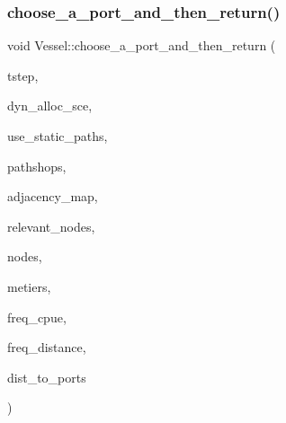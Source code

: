 \mbox{\label{class_vessel_a88fd9bd55e3ca8312d00adea41db2894}} 
\subsubsection{\texorpdfstring{choose\_a\_port\_and\_then\_return()}{choose\_a\_port\_and\_then\_return()}}
{\footnotesize\ttfamily void Vessel\+::choose\+\_\+a\+\_\+port\+\_\+and\+\_\+then\+\_\+return (\begin{DoxyParamCaption}\item[{int}]{tstep,  }\item[{const \mbox{\hyperlink{class_dyn_alloc_options}{Dyn\+Alloc\+Options}} \&}]{dyn\+\_\+alloc\+\_\+sce,  }\item[{int}]{use\+\_\+static\+\_\+paths,  }\item[{const std\+::vector$<$ \mbox{\hyperlink{class_path_shop}{Path\+Shop}} $>$ \&}]{pathshops,  }\item[{\mbox{\hyperlink{myutils_8h_ae689dbcb43e66abf9a513718b83bd87d}{adjacency\+\_\+map\+\_\+t}} \&}]{adjacency\+\_\+map,  }\item[{vector$<$ \mbox{\hyperlink{classtypes_1_1_node_id}{types\+::\+Node\+Id}} $>$ \&}]{relevant\+\_\+nodes,  }\item[{std\+::vector$<$ \mbox{\hyperlink{class_node}{Node}} $\ast$ $>$ \&}]{nodes,  }\item[{std\+::vector$<$ \mbox{\hyperlink{class_metier}{Metier}} $\ast$ $>$ \&}]{metiers,  }\item[{std\+::ofstream \&}]{freq\+\_\+cpue,  }\item[{std\+::ofstream \&}]{freq\+\_\+distance,  }\item[{std\+::vector$<$ double $>$ \&}]{dist\+\_\+to\+\_\+ports }\end{DoxyParamCaption})}

\mbox{\label{class_vessel_a9b14c4da3f52cf2c1cbfa3520e01fd7f}} 
